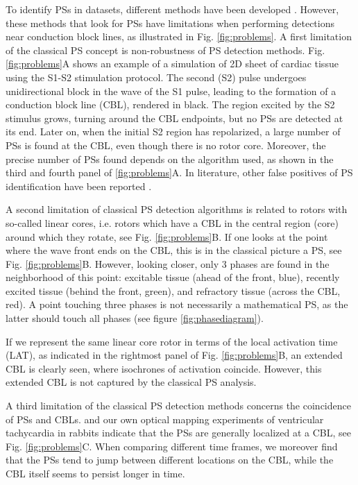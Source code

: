 \documentclass[aps,pre,amsfonts,amssymb,amsmath,twocolumn, superscriptaddress]{revtex4-1}
\begin{document}
To identify PSs in datasets, different methods have been developed \citep{Gray:1998,Fenton:1998,Bray:2003,Clayton:2005,Kuklik:2015,Kuklik:2017}. However, these methods that look for PSs have limitations when performing detections near conduction block lines, as illustrated in Fig. \ref{fig:problems}. 
A first limitation of the classical PS concept is non-robustness of PS detection methods. Fig. \ref{fig:problems}A shows an example of a simulation of 2D sheet of cardiac tissue using the S1-S2 stimulation protocol. The second (S2) pulse undergoes unidirectional block in the wave of the S1 pulse, leading to the formation of a conduction block line (CBL), rendered in black. The region excited by the S2 stimulus grows, turning around the CBL endpoints, but no PSs are detected at its end. Later on, when the initial S2 region has repolarized, a large number of PSs is found at the CBL, even though there is no rotor core. Moreover, the precise number of PSs found depends on the algorithm used, as shown in the third and fourth panel of \ref{fig:problems}A. In literature, other false positives of PS identification have been reported \citep{Podziemski:2018}.

A second limitation of classical PS detection algorithms is related to rotors with so-called linear cores, i.e. rotors which have a CBL in the central region (core) around which they rotate, see Fig. \ref{fig:problems}B. If one looks at the point where the wave front ends on the CBL, this is in the classical picture a PS, see Fig. \ref{fig:problems}B. However, looking closer, only 3 phases are found in the neighborhood of this point: excitable tissue (ahead of the front, blue), recently excited tissue (behind the front, green), and refractory tissue (across the CBL, red). A point touching three phases is not necessarily a mathematical PS, as the latter should touch all phases (see figure \ref{fig:phasediagram}).

If we represent the same linear core rotor in terms of the local activation time (LAT), as indicated in the rightmost panel of Fig. \ref{fig:problems}B, an extended CBL is clearly seen, where isochrones of activation coincide. However, this extended CBL is not captured by the classical PS analysis.  

A third limitation of the classical PS detection methods concerns the coincidence of PSs and CBLs. \cite{Podziemski:2018} and our own optical mapping experiments of ventricular tachycardia in rabbits indicate that the PSs are generally localized at a CBL, see Fig. \ref{fig:problems}C. When comparing different time frames, we moreover find that the PSs tend to jump between different locations on the CBL, while the CBL itself seems to persist longer in time. 
\end{document}
